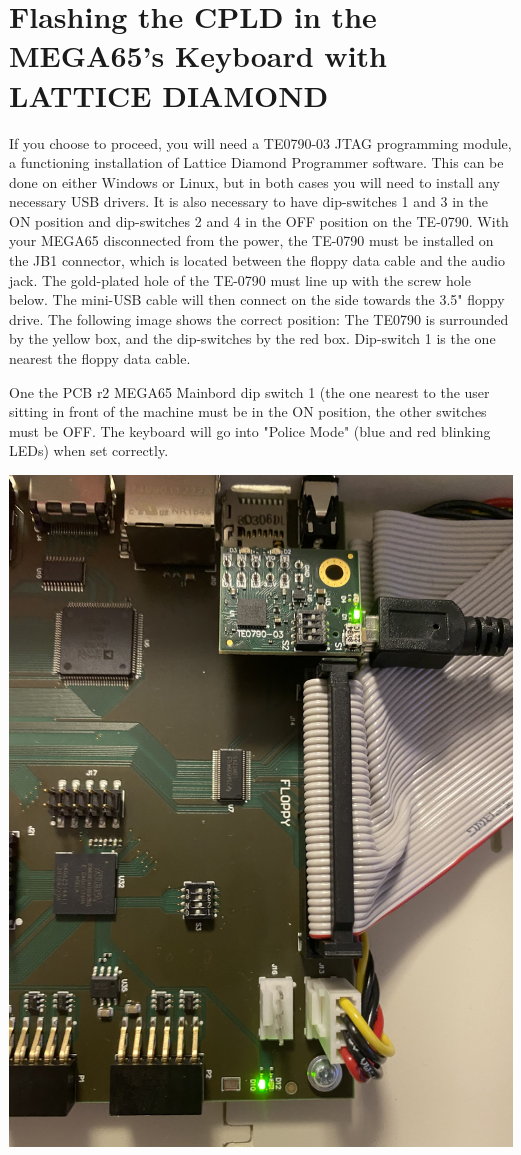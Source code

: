 \section{Flashing the CPLD in the MEGA65's Keyboard with LATTICE DIAMOND}


If you choose to proceed, you will need a TE0790-03 JTAG programming module, a functioning
installation of Lattice Diamond Programmer software.  This can be done on either Windows or Linux, but
in both cases you will need to install any necessary USB drivers. It is also necessary to have
dip-switches 1 and 3 in the ON position and dip-switches 2 and 4 in the OFF position on the TE-0790.
With your MEGA65 disconnected from the power, the TE-0790 must be installed on the JB1 connector,
which is located between the floppy data cable and the audio jack.
The gold-plated hole of the TE-0790 must line up with the screw
hole below.  The mini-USB cable will then connect on the side towards the 3.5" floppy drive.
The following image shows the correct position: The TE0790 is surrounded by the yellow box,
and the dip-switches by the red box. Dip-switch 1 is the one nearest the floppy data cable.

One the PCB r2 MEGA65 Mainbord dip switch 1 (the one nearest to the user sitting in front of the machine
must be in the ON position, the other switches must be OFF. The keyboard will go into "Police Mode"
(blue and red blinking LEDs) when set correctly.


\includegraphics[width=\linewidth]{images/jtag_detail_05.jpg}


